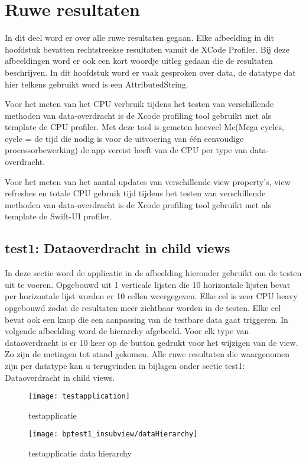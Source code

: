 \chapter{Ruwe resultaten}%
\label{ch:ruweresultaten}
In dit deel word er over alle ruwe resultaten gegaan. Elke afbeelding in dit hoofdstuk bevatten rechtstreekse resultaten vanuit de XCode Profiler. Bij deze afbeeldingen word er ook een kort woordje uitleg gedaan die de resultaten beschrijven. In dit hoofdstuk word er vaak gesproken over data, de datatype dat hier telkens gebruikt word is een AttributedString.

Voor het meten van het CPU verbruik tijdens het testen van verschillende methoden van data-overdracht is de Xcode profiling tool gebruikt met als template de CPU profiler. Met deze tool is gemeten hoeveel Mc(Mega cycles, cycle = 
de tijd die nodig is voor de uitvoering van één eenvoudige processorbewerking) de app vereist heeft van de CPU per type van data-overdracht. 

Voor het meten van het aantal updates van verschillende view property's, view refreshes en totale CPU gebruik tijd tijdens het testen van verschillende methoden van data-overdracht is de Xcode profiling tool gebruikt met als template de Swift-UI profiler. 

\section{test1: Dataoverdracht in child views}
In deze sectie word de applicatie in de afbeelding hieronder gebruikt om de testen uit te voeren. Opgebouwd uit 1 verticale lijsten die 10 horizontale lijsten bevat per horizontale lijst worden er 10 cellen weergegeven. Elke cel is zeer CPU heavy opgebouwd zodat de resultaten meer zichtbaar worden in de testen. Elke cel bevat ook een knop die een aanpassing van de testbare data gaat triggeren. In volgende afbeelding word de hierarchy afgebeeld. Voor elk type van dataoverdracht is er 10 keer op de button gedrukt voor het wijzigen van de view. Zo zijn de metingen tot stand gekomen. Alle ruwe resultaten die waargenomen zijn per datatype kan u terugvinden in bijlagen onder sectie test1: Dataoverdracht in child views. 
\begin{figure}[H]
    \centering
    \texttt{[image: testapplication]} 
    \caption{testapplicatie}
    \label{fig:testapplication}
\end{figure}
\begin{figure}[H]
    \centering
    \texttt{[image: bptest1\_insubview/dataHierarchy]} 
    \caption{testapplicatie data hierarchy}
    \label{fig:testapplicationHierarchy}
\end{figure}

